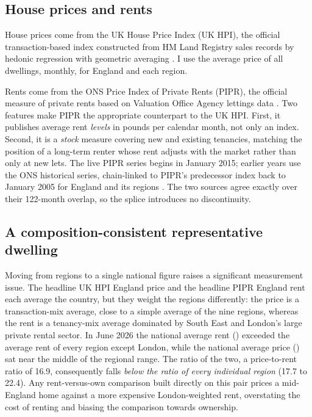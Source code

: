 \subsection{House prices and rents}

House prices come from the UK House Price Index (UK HPI), the official transaction-based index constructed from HM Land Registry sales records by hedonic regression with geometric averaging \parencite{ukhpi}. I use the average price of all dwellings, monthly, for England and each region.

Rents come from the ONS Price Index of Private Rents (PIPR), the official measure of private rents based on Valuation Office Agency lettings data \parencite{ons_pipr,ons_bulletin2026}. Two features make PIPR the appropriate counterpart to the UK HPI. First, it publishes average rent \emph{levels} in pounds per calendar month, not only an index. Second, it is a \emph{stock} measure covering new and existing tenancies, matching the position of a long-term renter whose rent adjusts with the market rather than only at new lets. The live PIPR series begins in January 2015; earlier years use the ONS historical series, chain-linked to PIPR's predecessor index back to January 2005 for England and its regions \parencite{ons_pipr_hist}. The two sources agree exactly over their 122-month overlap, so the splice introduces no discontinuity.

\subsection{A composition-consistent representative dwelling}
\label{sec:representative}

Moving from regions to a single national figure raises a significant measurement issue. The headline UK HPI England price and the headline PIPR England rent each average the country, but they weight the regions differently: the price is a transaction-mix average, close to a simple average of the nine regions, whereas the rent is a tenancy-mix average dominated by South East and London's large private rental sector. In June 2026 the national average rent () exceeded the average rent of every region except London, while the national average price () sat near the middle of the regional range. The ratio of the two, a price-to-rent ratio of 16.9, consequently falls \emph{below the ratio of every individual region} (17.7 to 22.4). Any rent-versus-own comparison built directly on this pair prices a mid-England home against a more expensive London-weighted rent, overstating the cost of renting and biasing the comparison towards ownership.

